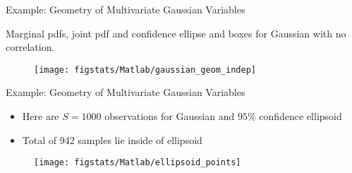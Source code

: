 \documentclass[9pt]{beamer}
\begin{document}
%
\begin{frame}{Example: Geometry of Multivariate Gaussian Variables}

Marginal pdfs, joint pdf and confidence ellipse and boxes for Gaussian with no correlation. 
\begin{figure}[!htb]
    \centering
	\texttt{[image: figstats/Matlab/gaussian\_geom\_indep]}
\end{figure}

\end{frame}

%
\begin{frame}{Example: Geometry of Multivariate Gaussian Variables}

\begin{itemize}
\item Here are $S=1000$ observations for Gaussian and $95\%$ confidence ellipsoid
\item Total of 942 samples lie inside of ellipsoid 
\end{itemize}
\begin{figure}[!htb]
    \centering
	\texttt{[image: figstats/Matlab/ellipsoid\_points]}
\end{figure}

\end{frame}
\end{document}
